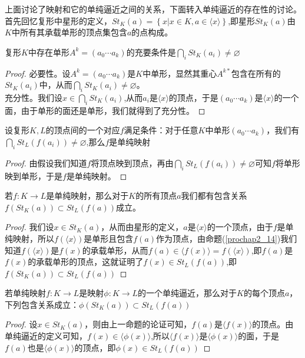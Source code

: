 上面讨论了映射和它的单纯逼近之间的关系，下面转入单纯逼近的存在性的讨论。首先回忆复形中星形的定义，$St_{K}(a)=\left\{x|x\in K,a\in\langle x\rangle\right\}$,即星形$St_{K}(a)$由$K$中所有其承载单形的顶点集包含$a$的点构成。
\begin{proposition}\label{chap2pro_27}
复形$K$中存在单形$A^{k}=(a_{0}\cdots a_{k})$的充要条件是$\bigcap\limits_{i}St_{K}(a_{i})\neq \varnothing$
\end{proposition}
\begin{proof}
必要性。设$A^{k}=(a_{0}\cdots a_{k})$是$K$中单形，显然其重心$A^{k*}$包含在所有的$St_{K}(a_{i})$中，从而$\bigcap\limits_{i}St_{K}(a_{i})\neq \varnothing$。\\
充分性。我们设$x\in\bigcap\limits_{i}St_{K}(a_{i})$,从而$a_{i}$是$\langle x\rangle$的顶点，于是$(a_{0}\cdots a_{k})$是$\langle x\rangle$的一个面，由于单形的面还是单形，我们就得到了充分性。
\end{proof}
\begin{corollary}
设复形$K,L$的顶点间的一个对应$f$满足条件：对于任意$K$中单形$(a_{0}\cdots a_{k})$，我们有$\bigcap\limits_{i}St_{L}(f(a_{i}))\neq \varnothing$,那么$f$是单纯映射
\end{corollary}
\begin{proof}
由假设我们知道$f$将顶点映到顶点，再由$\bigcap\limits_{i}St_{L}(f(a_{i}))\neq \varnothing$可知$f$将单形映到单形，于是$f$是单纯映射。
\end{proof}
\begin{proposition}
若$f:K\rightarrow L$是单纯映射，那么对于$K$的所有顶点$a$我们都有包含关系$f(St_{K}(a))\subset St_{L}(f(a))$成立。
\end{proposition}
\begin{proof}
我们设$x\in St_{K}(a)$，从而由星形的定义，$a$是$\langle x\rangle$的一个顶点，由于$f$是单纯映射，所以$f(\langle x\rangle)$是单形且包含$f(a)$作为顶点，由命题(\ref{prochap2_14})我们知道$f(\langle x\rangle)$是$f(x)$的承载单形，从而$f(a)\in \langle f(x)\rangle=f(\langle x\rangle)$,即$f(a)$是$f(x)$的承载单形的顶点，这就证明了$f(x)\in St_{L}(f(a))$,即$f(St_{K}(a))\subset St_{L}(f(a))$
\end{proof}
\begin{proposition}
若单纯映射$f:K\rightarrow L$是映射$\phi:K \rightarrow L$的一个单纯逼近，那么对于$K$的每个顶点$a$，下列包含关系成立：$\phi(St_{K}(a))\subset St_{L}(f(a))$
\end{proposition}
\begin{proof}
设$x \in St_{K}(a)$，则由上一命题的论证可知，$f(a)$是$\langle f(x)\rangle$的顶点。由单纯逼近的定义可知，$f(x)\in\langle \phi(x)\rangle$,所以$\langle f(x)\rangle$是$\langle \phi(x)\rangle$的面，于是$f(a)$也是$\langle \phi(x)\rangle$的顶点，即$\phi(x)\in St_{L}(f(a))$
\end{proof}
